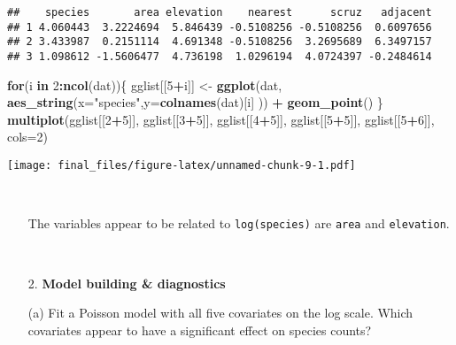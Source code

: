 \documentclass[]{article}
\newenvironment{Shaded}{\begin{snugshade}}{\end{snugshade}}
\newcommand{\KeywordTok}[1]{\textcolor[rgb]{0.13,0.29,0.53}{\textbf{#1}}}
\newcommand{\DataTypeTok}[1]{\textcolor[rgb]{0.13,0.29,0.53}{#1}}
\newcommand{\DecValTok}[1]{\textcolor[rgb]{0.00,0.00,0.81}{#1}}
\newcommand{\StringTok}[1]{\textcolor[rgb]{0.31,0.60,0.02}{#1}}
\newcommand{\ControlFlowTok}[1]{\textcolor[rgb]{0.13,0.29,0.53}{\textbf{#1}}}
\newcommand{\OperatorTok}[1]{\textcolor[rgb]{0.81,0.36,0.00}{\textbf{#1}}}
\newcommand{\NormalTok}[1]{#1}
\begin{document}
\begin{verbatim}
##    species       area elevation    nearest      scruz   adjacent
## 1 4.060443  3.2224694  5.846439 -0.5108256 -0.5108256  0.6097656
## 2 3.433987  0.2151114  4.691348 -0.5108256  3.2695689  6.3497157
## 3 1.098612 -1.5606477  4.736198  1.0296194  4.0724397 -0.2484614
\end{verbatim}

\begin{Shaded}
\begin{Highlighting}[]
\ControlFlowTok{for}\NormalTok{(i }\ControlFlowTok{in} \DecValTok{2}\OperatorTok{:}\KeywordTok{ncol}\NormalTok{(dat))\{  gglist[[}\DecValTok{5}\OperatorTok{+}\NormalTok{i]] <-}\StringTok{ }
\StringTok{  }\KeywordTok{ggplot}\NormalTok{(dat, }\KeywordTok{aes_string}\NormalTok{(}\DataTypeTok{x=}\StringTok{"species"}\NormalTok{,}\DataTypeTok{y=}\KeywordTok{colnames}\NormalTok{(dat)[i]  )) }\OperatorTok{+}\StringTok{   }\KeywordTok{geom_point}\NormalTok{()    \}}
\KeywordTok{multiplot}\NormalTok{(gglist[[}\DecValTok{2}\OperatorTok{+}\DecValTok{5}\NormalTok{]], gglist[[}\DecValTok{3}\OperatorTok{+}\DecValTok{5}\NormalTok{]], gglist[[}\DecValTok{4}\OperatorTok{+}\DecValTok{5}\NormalTok{]], gglist[[}\DecValTok{5}\OperatorTok{+}\DecValTok{5}\NormalTok{]],}
\NormalTok{    gglist[[}\DecValTok{5}\OperatorTok{+}\DecValTok{6}\NormalTok{]],   }\DataTypeTok{cols=}\DecValTok{2}\NormalTok{)}
\end{Highlighting}
\end{Shaded}

\texttt{[image: final\_files/figure-latex/unnamed-chunk-9-1.pdf]}

~

\begin{itemize} \item[] 
The variables appear to be related to {\tt log(species)} are {\tt area} and {\tt elevation}.
\end{itemize}

~

\begin{itemize}
\item[2.] {\bf Model building \& diagnostics}
\end{itemize}

\begin{itemize} \item[] 
\item[(a)] Fit a Poisson model with all five covariates on the log scale. Which covariates appear to have a significant effect on species counts?
\end{itemize}
\end{document}
